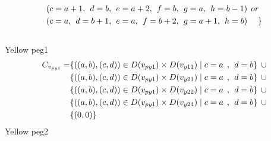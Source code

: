 \begin{align*}
&(c = a+1,\hspace{1ex}d = b,\hspace{1ex}e = a+2, \hspace{1ex}f = b,\hspace{1ex}g=a,\hspace{1ex}h=b-1)\hspace{1ex} or\\
&(c = a,\hspace{1ex}d = b+1,\hspace{1ex}e = a, \hspace{1ex}f = b+2,\hspace{1ex}g=a+1,\hspace{1ex}h=b)\hspace{3ex} \} 
\end{align*}
\\ Yellow peg1
\begin{align*}  
C_{v_{py1}} = &\{((a,b),(c,d))\in D(v_{py1}) \times D(v_{y11})\mid c = a \hspace{1ex} , \hspace{1ex}  d = b\}\hspace{1ex} \cup  
\\&\{((a,b),(c,d))\in D(v_{py1}) \times D(v_{y21})\mid c = a \hspace{1ex} , \hspace{1ex}  d = b\}\hspace{1ex} \cup 
\\&\{ ((a,b),(c,d))\in D(v_{py1}) \times D(v_{y22})\mid c = a \hspace{1ex} , \hspace{1ex}  d = b\}\hspace{1ex}\cup 
\\& \{((a,b),(c,d))\in D(v_{py1}) \times D(v_{y24})\mid c = a \hspace{1ex} , \hspace{1ex}  d = b\} \hspace{1ex}\cup
\\& \{(0,0)\}
\end{align*}
 Yellow peg2 
